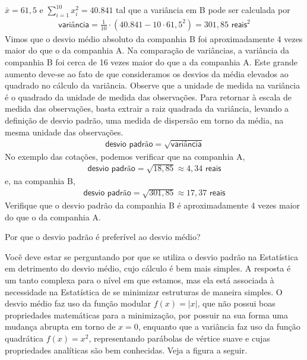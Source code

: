 {{{{\(\bar{x}=61,5\) e \(\displaystyle{\sum^{10}_{i=1}} x^2_i=40.841\) tal que a variância em B pode ser calculada por
\begin{equation*}
\begin{split}\textsf{variância}=\frac{1}{10}\cdot (40.841-10\cdot 61,5^2)=301,85\textsf{ reais}^2\end{split}
\end{equation*}
Vimos que o desvio médio absoluto da companhia B foi aproximadamente 4 vezes maior do que o da companhia A. Na comparação de variâncias, a variância da companhia B foi cerca de 16 vezes maior do que a da companhia A. Este grande aumento deve-se ao fato de que consideramos os desvios da média elevados ao quadrado no cálculo da variância. Observe que a unidade de medida na variância é o quadrado da unidade de medida das observações. Para retornar à escala de medida das observações, basta extrair a raiz quadrada da variância, levando a definição de desvio padrão, uma medida de dispersão em torno da média, na mesma unidade das observações.
\begin{equation*}
\begin{split}\textsf{desvio padrão}=\sqrt{\textsf{variância}}\end{split}
\end{equation*}
No exemplo das cotações, podemos verificar que na companhia A,
\begin{equation*}
\begin{split}\textsf{desvio padrão}=\sqrt{18,85} \approx 4,34 \textsf{ reais}\end{split}
\end{equation*}
e, na companhia B,
\begin{equation*}
\begin{split}\textsf{desvio padrão}=\sqrt{301,85}\approx 17,37\textsf{ reais}\end{split}
\end{equation*}
Verifique que o desvio padrão da companhia B é aproximadamente 4 vezes maior do que o da companhia A.

\begin{observation}{Por que o desvio padrão é preferível ao desvio médio?}

Você deve estar se perguntando por que se utiliza o desvio padrão na Estatística em detrimento do desvio médio, cujo cálculo é bem mais simples. A resposta é um tanto complexa para o nível em que estamos, mas ela está associada à necessidade na Estatística de se minimizar estruturas de maneira simples. O desvio médio faz uso da função modular \(f(x)=|x|\), que não possui boas propriedades matemáticas para a minimização, por possuir na sua forma uma mudança abrupta em torno de \(x=0\),  enquanto que a variância faz uso da função quadrática \(f(x)=x^2\), representando parábolas de vértice suave e cujas propriedades analíticas são bem conhecidas. Veja a figura a seguir.


\end{observation}}}}}
